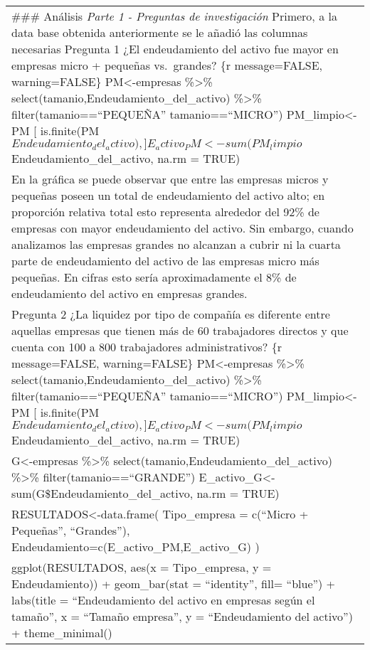 \documentclass[
]{article}
\begin{document}
\begin{longtable}[]{@{}
  >{\raggedright\arraybackslash}p{}@{}}
\toprule\noalign{}
\endhead
\bottomrule\noalign{}
\endlastfoot
\#\#\# Análisis \emph{Parte 1 - Preguntas de investigación} Primero, a
la data base obtenida anteriormente se le añadió las columnas necesarias
Pregunta 1 ¿El endeudamiento del activo fue mayor en empresas micro +
pequeñas vs.~grandes? \{r message=FALSE, warning=FALSE\}
PM\textless-empresas \%\textgreater\%
select(tamanio,Endeudamiento\_del\_activo) \%\textgreater\%
filter(tamanio==``PEQUEÑA'' \textbar{} tamanio==``MICRO'')
PM\_limpio\textless-PM {[}
is.finite(PM\(Endeudamiento_del_activo), ] E_activo_PM<-sum(PM_limpio\)Endeudamiento\_del\_activo,
na.rm = TRUE) \\
En la gráfica se puede observar que entre las empresas micros y pequeñas
poseen un total de endeudamiento del activo alto; en proporción relativa
total esto representa alrededor del 92\% de empresas con mayor
endeudamiento del activo. Sin embargo, cuando analizamos las empresas
grandes no alcanzan a cubrir ni la cuarta parte de endeudamiento del
activo de las empresas micro más pequeñas. En cifras esto sería
aproximadamente el 8\% de endeudamiento del activo en empresas
grandes. \\
Pregunta 2 ¿La liquidez por tipo de compañía es diferente entre aquellas
empresas que tienen más de 60 trabajadores directos y que cuenta con 100
a 800 trabajadores administrativos? \{r message=FALSE, warning=FALSE\}
PM\textless-empresas \%\textgreater\%
select(tamanio,Endeudamiento\_del\_activo) \%\textgreater\%
filter(tamanio==``PEQUEÑA'' \textbar{} tamanio==``MICRO'')
PM\_limpio\textless-PM {[}
is.finite(PM\(Endeudamiento_del_activo), ] E_activo_PM<-sum(PM_limpio\)Endeudamiento\_del\_activo,
na.rm = TRUE) \\
G\textless-empresas \%\textgreater\%
select(tamanio,Endeudamiento\_del\_activo) \%\textgreater\%
filter(tamanio==``GRANDE'')
E\_activo\_G\textless-sum(G\$Endeudamiento\_del\_activo, na.rm =
TRUE) \\
RESULTADOS\textless-data.frame( Tipo\_empresa = c(``Micro + Pequeñas'',
``Grandes''), Endeudamiento=c(E\_activo\_PM,E\_activo\_G) ) \\
ggplot(RESULTADOS, aes(x = Tipo\_empresa, y = Endeudamiento)) +
geom\_bar(stat = ``identity'', fill= ``blue'') + labs(title =
``Endeudamiento del activo en empresas según el tamaño'', x = ``Tamaño
empresa'', y = ``Endeudamiento del activo'') + theme\_minimal() \\

\end{longtable}
\end{document}
